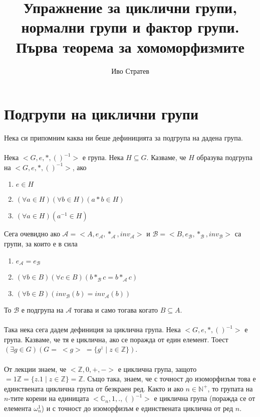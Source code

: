 \documentclass[12pt]{article}
\title{Упражнение за циклични групи, нормални групи и фактор групи. Първа теорема за хомоморфизмите}
\author{Иво Стратев}
\begin{document}
\maketitle

\section{Подгрупи на циклични групи}
Нека си припомним каква ни беше дефиницията за подгрупа на дадена група.
\\
\vspace{2mm}
\\
Нека \(<G, e, *, ()^{-1}>\) е група. Нека \(H \subseteq G\).
Казваме, че \(H\) образува подгрупа на \(<G, e, *, ()^{-1}>\), ако
\begin{enumerate}
    \item \(e \in H\)
    \item \((\forall a \in H)(\forall b \in H)(a * b \in H)\)
    \item \((\forall a \in H)(a^{-1} \in H)\)
\end{enumerate}

Сега очевидно ако \(\mathcal{A} = <A, e_\mathcal{A}, *_\mathcal{A}, inv_\mathcal{A}>\)
и \(\mathcal{B} = <B, e_\mathcal{B}, *_\mathcal{B}, inv_\mathcal{B}>\) са групи,
за които е в сила
\begin{enumerate}
    \item \(e_\mathcal{A} = e_\mathcal{B}\)
    \item \((\forall b \in B)(\forall c \in B)(b *_\mathcal{B} c = b *_\mathcal{A} c)\)
    \item \((\forall b \in B)(inv_\mathcal{B}(b) = inv_\mathcal{A}(b))\)
\end{enumerate}

То \(\mathcal{B}\) е подгрупа на \(\mathcal{A}\) тогава и само тогава когато  \(B \subseteq A\).
\\
\vspace{2mm}
\\
Така нека сега дадем дефиниция за циклична група.
Нека \(<G, e, *, ()^{-1}>\) е група.
Казваме, че тя е циклична, ако се поражда от един елемент. Тоест
\((\exists g \in G)(G = \; <g> \; = \{g^z \; | \; z \in \mathbb{Z}\})\).
\\
\vspace{2mm}
\\
От лекции знаем, че \(<\mathbb{Z}, 0, +, ->\) е циклична група,
защото \(<1> = 1\mathbb{Z} = \{z.1 \; | \; z \in \mathbb{Z}\} = \mathbb{Z}\).
Също така, знаем, че с точност до изоморфизъм това е единствената циклична група от безкраен ред.
Както и ако \(n \in \mathbb{N}^+\), то групата на \(n\)-тите корени на единицата
\(<\mathbb{C}_n, 1, . , ()^{-1}>\) е циклична група (поражда се от елемента \(\omega_n^1\)) и с точност до изоморфизъм е единствената циклична от ред \(n\).
\end{document}
